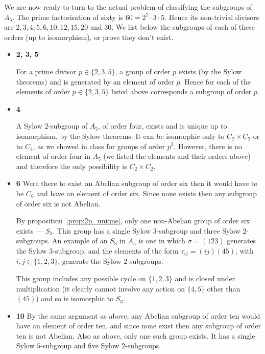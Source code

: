 \documentclass[11pt]{article} \usepackage{amssymb}
\begin{document}
\begin{enumerate}
    We are now ready to turn to the actual problem of classifying the subgroups
    of $A_5$.
    The prime factorisation of sixty is $60=2^2\cdot 3\cdot 5$. Hence its non-trivial
    divisors are $2,3,4,5,6,10,12,15,20$ and $30$. We list below the subgroups
    of each of these orders (up to isomorphism), or prove they don't exist.

    \begin{itemize}
    \item {\bf 2, 3, 5}
      
      For a prime divisor $p\in\{2,3,5\}$, a group of order $p$ exists 
      (by the Sylow theorems) and is generated by
      an element of order $p$. Hence for each of the elements of order 
      $p\in\{2,3,5\}$ listed above
      corresponds a subgroup of order $p$.

    \item {\bf 4}
      
      A Sylow $2$-subgroup of $A_5$, of order four,
      exists and is unique up to isomorphism, by the Sylow theorems. It can
      be isomorphic only to $C_2\times C_2$ or to $C_4$, as we showed in class
      for groups of order $p^2$. However, there is no element of order four
      in $A_5$ (we listed the elements and their orders above) and therefore
      the only possibility is $C_2 \times C_2$. 
      
    \item {\bf 6}
      Were there to exist an Abelian subgroup of order six then it would have
      to be $C_6$ and have an element of order six. Since none exists then
      any subgroup of order six is not Abelian.
      
      By proposition~\ref{prop:2p_unique}, only one non-Abelian group of order 
      six exists --- $S_3$. This group has
      a single Sylow $3$-subgroup and three Sylow $2$-subgroups. An example
      of an $S_3$ in $A_5$ is one in which $\sigma=(1 2 3)$ generates the Sylow
      $3$-subgroup, and the elements of the form $\tau_{ij}=(ij)(45)$, with 
      $i,j \in \{1,2,3\}$, generate the Sylow $2$-subgroups. 

      This group includes any possible cycle on $\{1,2,3\}$ and is closed under
      multiplication (it clearly cannot involve any action on $\{4,5\}$ other
      than $(45)$) and so is isomorphic to $S_3$.

    \item {\bf 10}
      By the same argument as above, any Abelian subgroup of order ten would
      have an element of order ten, and since none exist then  
      any subgroup of order ten is not Abelian. Also as above, only one such
      group exists. It has a single Sylow $5$-subgroup and five Sylow 
      $2$-subgroups.


\end{itemize}
\end{enumerate}
\end{document}
